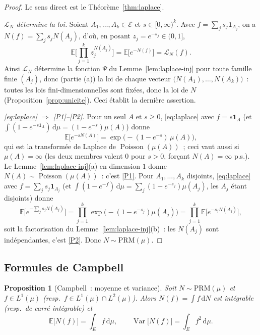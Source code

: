 \documentclass[11pt,a4paper]{article}
\theoremstyle{plain}
\newtheorem{proposition}[theoreme]{Proposition}
\theoremstyle{definition}
\newcommand{\E}{\mathbb{E}}
\newcommand{\Var}{\operatorname{Var}}
\newcommand{\Poi}{\operatorname{Poisson}}
\newcommand{\one}{\mathbf{1}}
\newcommand{\dd}{\,\mathrm{d}}
\newcommand{\calE}{\mathcal{E}}
\newcommand{\calL}{\mathcal{L}}
\begin{document}
\begin{proof}
Le sens direct est le Théorème~\ref{thm:laplace}.

\emph{$\calL_N$ détermine la loi.} Soient $A_1,\dots,A_k\in\calE$ et $s\in[0,\infty)^k$. Avec $f=\sum_j s_j\one_{A_j}$, on a $N(f)=\sum_j s_j N(A_j)$, d'où, en posant $z_j=e^{-s_j}\in(0,1]$,
\[
\E\Big[\prod_{j=1}^k z_j^{N(A_j)}\Big]=\E\big[e^{-N(f)}\big]=\calL_N(f).
\]
Ainsi $\calL_N$ détermine la fonction $\Psi$ du Lemme~\ref{lem:laplace-inj} pour toute famille finie $(A_j)$, donc (partie (a)) la loi de chaque vecteur $\big(N(A_1),\dots,N(A_k)\big)$~: toutes les lois fini-dimensionnelles sont fixées, donc la loi de $N$ (Proposition~\ref{prop:unicite}). Ceci établit la dernière assertion.

\emph{\eqref{eq:laplace} $\Rightarrow$ \ref{P1}--\ref{P2}.} Pour un seul $A$ et $s\ge0$, \eqref{eq:laplace} avec $f=s\one_A$ (et $\int(1-e^{-s\one_A})\dd\mu=(1-e^{-s})\mu(A)$) donne
\[
\E\big[e^{-sN(A)}\big]=\exp\!\big(-(1-e^{-s})\,\mu(A)\big),
\]
qui est la transformée de Laplace de $\Poi(\mu(A))$~; ceci vaut aussi si $\mu(A)=\infty$ (les deux membres valent $0$ pour $s>0$, forçant $N(A)=\infty$ p.s.). Le Lemme~\ref{lem:laplace-inj}(a) en dimension $1$ donne $N(A)\sim\Poi(\mu(A))$~: c'est \ref{P1}. Pour $A_1,\dots,A_k$ disjoints, \eqref{eq:laplace} avec $f=\sum_j s_j\one_{A_j}$ (et $\int(1-e^{-f})\dd\mu=\sum_j(1-e^{-s_j})\mu(A_j)$, les $A_j$ étant disjoints) donne
\[
\E\Big[e^{-\sum_j s_j N(A_j)}\Big]
=\prod_{j=1}^k\exp\!\big(-(1-e^{-s_j})\mu(A_j)\big)
=\prod_{j=1}^k\E\big[e^{-s_j N(A_j)}\big],
\]
soit la factorisation du Lemme~\ref{lem:laplace-inj}(b)~: les $N(A_j)$ sont indépendantes, c'est \ref{P2}. Donc $N\sim\mathrm{PRM}(\mu)$.
\end{proof}

\subsection{Formules de Campbell}

\begin{proposition}[Campbell~: moyenne et variance]\label{prop:campbell}
Soit $N\sim\mathrm{PRM}(\mu)$ et $f\in L^1(\mu)$ (resp.\ $f\in L^1(\mu)\cap L^2(\mu)$). Alors $N(f)=\int f\dd N$ est intégrable (resp.\ de carré intégrable) et
\[
\E\big[N(f)\big]=\int_E f\dd\mu,
\qquad
\Var\big[N(f)\big]=\int_E f^2\dd\mu.
\]
\end{proposition}
\end{document}
